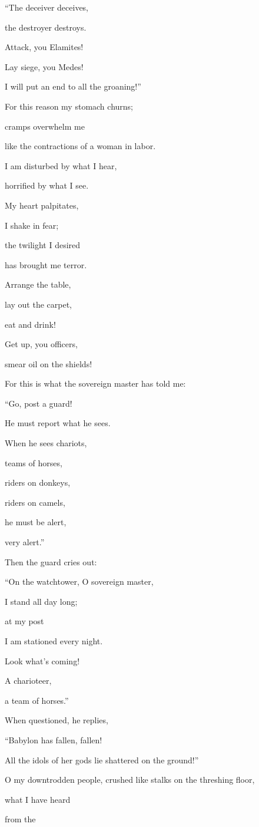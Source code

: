 {\par }{\Q “The deceiver
deceives,
\par }{\Q the destroyer
destroys.
\par }{\Q Attack,
you Elamites!
\par }{\Q Lay siege,
you Medes!
\par }{\Q I will put an end
to all
the groaning!”
\par }{\Q {}For this reason
my stomach
churns;
\par }{\Q cramps
overwhelm
me
\par }{\Q like the contractions
of a woman in labor.
\par }{\Q I am disturbed
by what I hear,
\par }{\Q horrified
by what I see.
\par }{\Q {}My
heart
palpitates,
\par }{\Q I shake in fear;
\par }{\Q the twilight
I desired
\par }{\Q has brought
me terror.
\par }{\Q {}Arrange
the table,
\par }{\Q lay out the carpet,
\par }{\Q eat
and drink!

\par }{\Q Get
up, you officers,
\par }{\Q smear
oil on the shields!
\par }{\Q {}For
this is what
the sovereign
master has told
me:
\par }{\Q “Go,
post
a guard!
\par }{\Q He must report what
he sees.
\par }{\Q {}When he sees
chariots,
\par }{\Q teams
of horses,
\par }{\Q riders
on donkeys,
\par }{\Q riders
on camels,
\par }{\Q he must
be alert,
\par }{\Q very
alert.”
\par }{\Q {}Then the guard
cries out:
\par }{\Q “On
the watchtower,
O sovereign master,
\par }{\Q I
stand
all
day
long;
\par }{\Q at
my post
\par }{\Q I
am stationed
every
night.
\par }{\Q {}Look
what’s
coming!
\par }{\Q A charioteer,
\par }{\Q a team
of horses.”
\par }{\Q When
questioned, he replies,
\par }{\Q “Babylon
has fallen,
fallen!
\par }{\Q All
the idols
of her gods
lie shattered
on the ground!”
\par }{\Q {}O my downtrodden
people,
crushed like stalks on the threshing floor,
\par }{\Q what
I have heard
\par }{\Q from the

}

